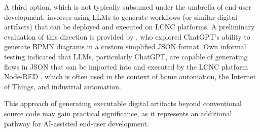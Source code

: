 \documentclass[english,anonymous]{lni}
\begin{document}
A third option, which is not typically subsumed under the umbrella of end-user development, involves using LLMs to generate workflows (or similar digital artifacts) that can be deployed and executed on LCNC platforms. A preliminary evaluation of this direction is provided by \cite{fillConceptualModelingLarge2023}, who explored ChatGPT’s ability to generate BPMN diagrams in a custom simplified JSON format. Own informal testing indicated that LLMs, particularly ChatGPT, are capable of generating flows in JSON that can be imported into and executed by the LCNC platform Node-RED \cite{openjsfoundationLowcodeProgrammingEventdriven}, which is often used in the context of home automation, the Internet of Things, and industrial automation.
  
This approach of generating executable digital artifacts beyond conventional source code may gain practical significance, as it represents an additional pathway for AI-assisted end-user development.

\printbibliography
\end{document}
